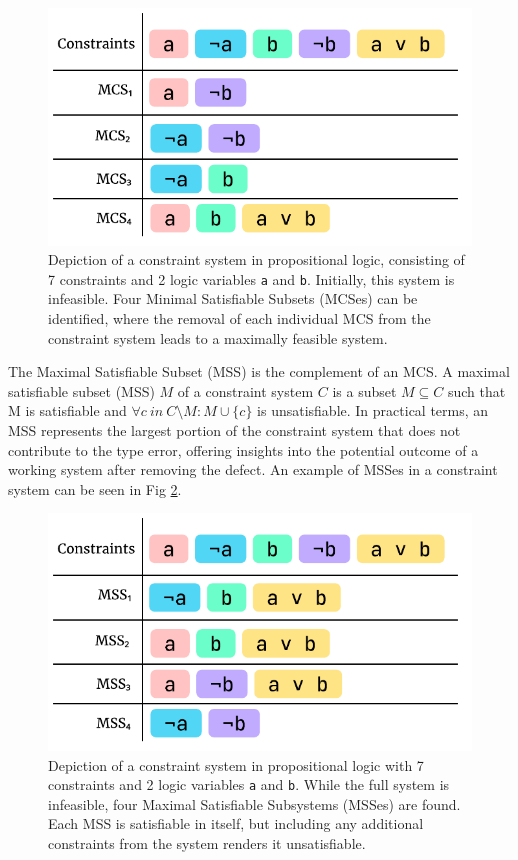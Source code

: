 \begin{figure}[hbt]
  \centering
  \includegraphics[width=0.8\linewidth]{MCS}
  \caption[An illustration of Minimal Satisfiable Subsets (MCSes)]{
    \label{fig:mcs-example}
    Depiction of a constraint system in propositional logic, consisting of 7 constraints and 2 logic variables \texttt{a} and \texttt{b}. Initially, this system is infeasible. Four Minimal Satisfiable Subsets (MCSes) can be identified, where the removal of each individual MCS from the constraint system leads to a maximally feasible system.}
\end{figure}

The Maximal Satisfiable Subset (MSS) is the complement of an MCS. A maximal satisfiable subset (MSS) $M$ of a constraint system $C$ is a subset $M \subseteq C$ such that M is satisfiable and $\forall{c}\ in\ C \setminus M:M\cup\{c\}$ is unsatisfiable. In practical terms, an MSS represents the largest portion of the constraint system that does not contribute to the type error, offering insights into the potential outcome of a working system after removing the defect. An example of MSSes in a constraint system can be seen in Fig \ref{fig:mss-example}.




\begin{figure}[hbt]
  \includegraphics[width=0.8\linewidth]{MSS}
  \caption[An illustration of Maximal Satisfiable Subsystems (MSSes)]{
    \label{fig:mss-example}
    Depiction of a constraint system in propositional logic with 7 constraints and 2 logic variables \texttt{a} and \texttt{b}. While the full system is infeasible, four Maximal Satisfiable Subsystems (MSSes) are found. Each MSS is satisfiable in itself, but including any additional constraints from the system renders it unsatisfiable. }
\end{figure}

